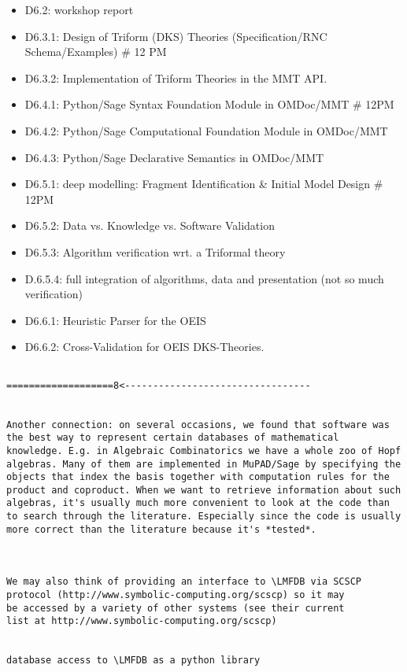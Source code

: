 \begin{Workpackage}{\thewpno}
\begin{WPDeliverables}
\begin{itemize}
\item D6.2: workshop report
\item D6.3.1: Design of Triform (DKS) Theories (Specification/RNC Schema/Examples)          \# 12 PM
\item D6.3.2: Implementation of Triform Theories in the MMT API. 

\item D6.4.1: Python/Sage Syntax Foundation Module in OMDoc/MMT                                   \# 12PM
\item D6.4.2: Python/Sage Computational Foundation Module in OMDoc/MMT
\item D6.4.3: Python/Sage Declarative Semantics in OMDoc/MMT

\item D6.5.1: \LMFDB deep modelling: Fragment Identification \& Initial Model Design              \# 12PM
\item D6.5.2: \LMFDB Data vs. Knowledge vs. Software Validation
\item D6.5.3: \LMFDB Algorithm verification wrt. a Triformal theory
\item D.6.5.4: \LMFDB full integration of algorithms, data and presentation (not so much verification)

\item D6.6.1: Heuristic Parser for the OEIS
\item D6.6.2: Cross-Validation for OEIS DKS-Theories.
\end{itemize}
\end{WPDeliverables}
\begin{verbatim}

===================8<---------------------------------


Another connection: on several occasions, we found that software was
the best way to represent certain databases of mathematical
knowledge. E.g. in Algebraic Combinatorics we have a whole zoo of Hopf
algebras. Many of them are implemented in MuPAD/Sage by specifying the
objects that index the basis together with computation rules for the
product and coproduct. When we want to retrieve information about such
algebras, it's usually much more convenient to look at the code than
to search through the literature. Especially since the code is usually
more correct than the literature because it's *tested*.



We may also think of providing an interface to \LMFDB via SCSCP
protocol (http://www.symbolic-computing.org/scscp) so it may
be accessed by a variety of other systems (see their current
list at http://www.symbolic-computing.org/scscp)


database access to \LMFDB as a python library


\end{verbatim}
\end{Workpackage}
